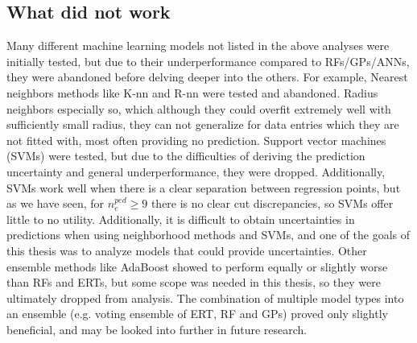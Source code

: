 \documentclass[a4paper, twoside, final, 12pt]{article}
\begin{document}
{
\subsection{What did not work}
Many different machine learning models not listed in the above analyses were initially tested, but due to their underperformance compared to RFs/GPs/ANNs, they were abandoned before delving deeper into the others. For example, Nearest neighbors methods like K-nn and R-nn were tested and abandoned. Radius neighbors especially so, which although they could overfit extremely well with sufficiently small radius, they can not generalize for data entries which they are not fitted with, most often providing no prediction. Support vector machines (SVMs) were tested, but due to the difficulties of deriving the prediction uncertainty and general underperformance, they were dropped. Additionally, SVMs work well when there is a clear separation between regression points, but as we have seen, for $n_e^{ped} \geq 9$ there is no clear cut discrepancies, so SVMs offer little to no utility. Additionally, it is difficult to obtain uncertainties in predictions when using neighborhood methods and SVMs, and one of the goals of this thesis was to analyze models that could provide uncertainties. Other ensemble methods like AdaBoost showed to perform equally or slightly worse than RFs and ERTs, but some scope was needed in this thesis, so they were ultimately dropped from analysis. The combination of multiple model types into an ensemble (e.g. voting ensemble of ERT, RF and GPs) proved only slightly beneficial, and may be looked into further in future research. 
}
\end{document}
